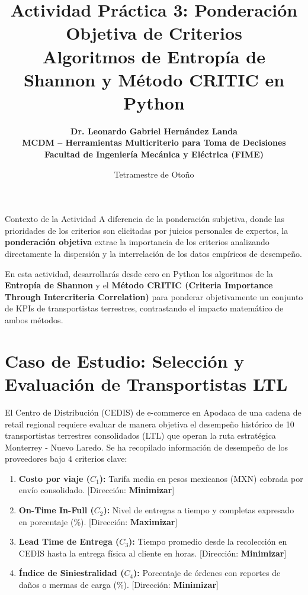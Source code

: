 \documentclass[11pt,a4paper]{article}
\title{%
  \sffamily\bfseries\color{UANLblue}%
  Actividad Práctica 3: Ponderación Objetiva de Criterios\\
  \large Algoritmos de Entropía de Shannon y Método CRITIC en Python
}
\author{%
  \sffamily\bfseries\color{FIMEdarkgray}%
  Dr. Leonardo Gabriel Hernández Landa\\
  \small MCDM -- Herramientas Multicriterio para Toma de Decisiones\\
  \small\color{FIMEgreen}Facultad de Ingeniería Mecánica y Eléctrica (FIME)
}
\date{\sffamily Tetramestre de Otoño}
\begin{document}
\maketitle
\thispagestyle{fancy}

\begin{brandbox}{Contexto de la Actividad}
  A diferencia de la ponderación subjetiva, donde las prioridades de los criterios son elicitadas por juicios personales de expertos, la \textbf{ponderación objetiva} extrae la importancia de los criterios analizando directamente la dispersión y la interrelación de los datos empíricos de desempeño.
  
  En esta actividad, desarrollarás desde cero en Python los algoritmos de la \textbf{Entropía de Shannon} y el \textbf{Método CRITIC (Criteria Importance Through Intercriteria Correlation)} para ponderar objetivamente un conjunto de KPIs de transportistas terrestres, contrastando el impacto matemático de ambos métodos.
\end{brandbox}

\section{Caso de Estudio: Selección y Evaluación de Transportistas LTL}
El Centro de Distribución (CEDIS) de e-commerce en Apodaca de una cadena de retail regional requiere evaluar de manera objetiva el desempeño histórico de 10 transportistas terrestres consolidados (LTL) que operan la ruta estratégica Monterrey - Nuevo Laredo. Se ha recopilado información de desempeño de los proveedores bajo 4 criterios clave:
\begin{enumerate}
    \item \textbf{Costo por viaje ($C_1$):} Tarifa media en pesos mexicanos (MXN) cobrada por envío consolidado. [Dirección: \textbf{Minimizar}]
    \item \textbf{On-Time In-Full ($C_2$):} Nivel de entregas a tiempo y completas expresado en porcentaje (\%). [Dirección: \textbf{Maximizar}]
    \item \textbf{Lead Time de Entrega ($C_3$):} Tiempo promedio desde la recolección en CEDIS hasta la entrega física al cliente en horas. [Dirección: \textbf{Minimizar}]
    \item \textbf{Índice de Siniestralidad ($C_4$):} Porcentaje de órdenes con reportes de daños o mermas de carga (\%). [Dirección: \textbf{Minimizar}]
\end{enumerate}
\end{document}

